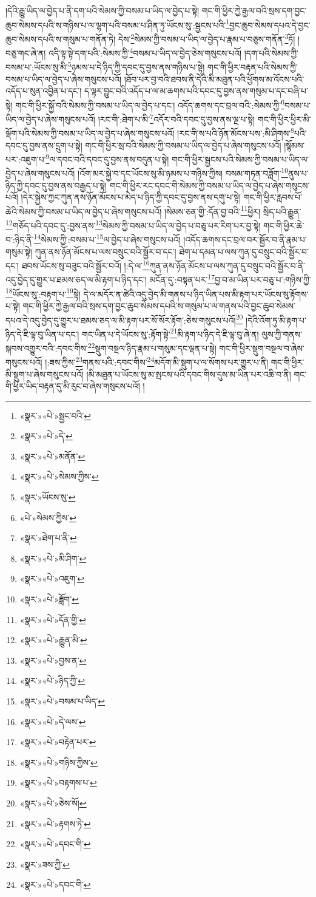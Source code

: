 །དེའི་རྒྱུ་ཡིད་ལ་བྱེད་པ་ནི་དག་པའི་སེམས་ཀྱི་བསམ་པ་ཡིད་ལ་བྱེད་པ་སྟེ། གང་གི་ཕྱིར་ཀྱེ་རྒྱལ་བའི་སྲས་དག་བྱང་ཆུབ་སེམས་དཔའི་ས་གཉིས་པ་ལ་ལྷག་པའི་བསམ་པ་ཤིན་ཏུ་ཡོངས་སུ་:སྦྱངས་པའི་\footnote{«སྣར་»«པེ་»སྦྱང་བའི་}བྱང་ཆུབ་སེམས་དཔའ་དེ་བྱང་ཆུབ་སེམས་དཔའི་ས་གསུམ་པ་གནོན་ཏེ། དེས་\footnote{«སྣར་»«པེ་»དེ་}སེམས་ཀྱི་བསམ་པ་ཡིད་ལ་བྱེད་པ་རྣམ་པ་བཅུས་གནོན་\footnote{«སྣར་»«པེ་»མནོན་}ཏོ། །བཅུ་གང་ཞེ་ན། འདི་ལྟ་སྟེ་དག་པའི་:སེམས་ཀྱི་\footnote{«སྣར་»«པེ་»སེམས་ཀྱིས་}བསམ་པ་ཡིད་ལ་བྱེད་ཅེས་གསུངས་པའོ། །དག་པའི་སེམས་ཀྱི་བསམ་པ་:ཡོངས་སུ་མི་\footnote{«སྣར་»ཡོངས་སུ་}ཉམས་པ་དེ་ཉིད་ཀྱི་དབང་དུ་བྱས་ནས་གཉིས་པ་སྟེ། གང་གི་ཕྱིར་བརྟན་པའི་སེམས་ཀྱི་བསམ་པ་ཡིད་ལ་བྱེད་པ་ཞེས་གསུངས་པའོ། །ཐོབ་པར་བྱ་བའི་ཐབས་ནི་དེའི་མི་མཐུན་པའི་ཕྱོགས་མ་འོངས་པའི་འདོད་པ་སུན་འབྱིན་པ་དང་། ད་ལྟར་བྱུང་བའི་འདོད་པ་ལ་མ་ཆགས་པའི་དབང་དུ་བྱས་ནས་གསུམ་པ་དང་བཞི་པ་སྟེ། གང་གི་ཕྱིར་སྐྱོ་བའི་སེམས་ཀྱི་བསམ་པ་ཡིད་ལ་བྱེད་པ་དང་། འདོད་ཆགས་དང་བྲལ་བའི་:སེམས་ཀྱི་\footnote{«པེ་»སེམས་ཀྱིས་}བསམ་པ་ཡིད་ལ་བྱེད་པ་ཞེས་གསུངས་པའོ། །རང་གི་:ཐེག་པ་མི་\footnote{«སྣར་»ཐེག་པ་ནི་}འདོར་བའི་དབང་དུ་བྱས་ནས་ལྔ་པ་སྟེ། གང་གི་ཕྱིར་ཕྱིར་མི་ལྡོག་པའི་སེམས་ཀྱི་བསམ་པ་ཡིད་ལ་བྱེད་པ་ཞེས་གསུངས་པའོ། །རང་གི་ས་པའི་ཉོན་མོངས་པས་:མི་ཤིགས་\footnote{«སྣར་»«པེ་»མི་ཤིག་}པའི་དབང་དུ་བྱས་ནས་དྲུག་པ་སྟེ། གང་གི་ཕྱིར་སྲ་བའི་སེམས་ཀྱི་བསམ་པ་ཡིད་ལ་བྱེད་པ་ཞེས་གསུངས་པའོ། །སྙོམས་པར་:འཇུག་པ་\footnote{«སྣར་»«པེ་»འཇུག་}ལ་དབང་བའི་དབང་དུ་བྱས་ནས་བདུན་པ་སྟེ། གང་གི་ཕྱིར་སྦྱངས་པའི་སེམས་ཀྱི་བསམ་པ་ཡིད་ལ་བྱེད་པ་ཞེས་གསུངས་པའོ། །འོག་མར་སྐྱེ་བ་དང་ཡོངས་སུ་མི་ཉམས་པ་གཉིས་ཀྱིས། བསམ་གཏན་བཟློག་\footnote{«སྣར་»«པེ་»ཟློག་}ནུས་པ་ཉིད་ཀྱི་དབང་དུ་བྱས་ནས་བརྒྱད་པ་སྟེ། གང་གི་ཕྱིར་རང་དབང་གི་སེམས་ཀྱི་བསམ་པ་ཡིད་ལ་བྱེད་པ་ཞེས་གསུངས་པའོ། །དེར་སྐྱེས་ཀྱང་ཀུན་ནས་ཉོན་མོངས་པ་མེད་པ་ཉིད་ཀྱི་དབང་དུ་བྱས་ནས་དགུ་པ་སྟེ། གང་གི་ཕྱིར་རླབས་པོ་ཆེའི་སེམས་ཀྱི་བསམ་པ་ཡིད་ལ་བྱེད་པ་ཞེས་གསུངས་པའོ། །སེམས་ཅན་གྱི་:དོན་བྱ་བའི་\footnote{«སྣར་»«པེ་»དོན་གྱི་}ཕྱིར། སྲིད་པའི་རྒྱུན་\footnote{«སྣར་»«པེ་»རྒྱུན་མི་}གཅོད་པའི་དབང་དུ་:བྱས་ནས་\footnote{«སྣར་»«པེ་»བྱས་ན་}སེམས་ཀྱི་བསམ་པ་ཡིད་ལ་བྱེད་པ་བཅུ་པར་རིག་པར་བྱ་སྟེ། གང་གི་ཕྱིར་ཆེ་བ་:ཉིད་ནི་\footnote{«སྣར་»«པེ་»ཉིད་ཀྱི་}སེམས་ཀྱི་:བསམ་པ་\footnote{«སྣར་»«པེ་»བསམ་པ་ཡིད་}ལ་བྱེད་པ་ཞེས་གསུངས་པའོ། །འདོད་ཆགས་དང་བྲལ་བར་སྦྱོར་བ་ནི་རྣམ་པ་གསུམ་སྟེ། ཀུན་ནས་ཉོན་མོངས་པ་ལས་བསྲུང་བའི་སྦྱོར་བ་དང་། ཐེག་པ་དམན་པ་ལས་ཀུན་དུ་བསྲུང་བའི་སྦྱོར་བ་དང་། ཐབས་ཡོངས་སུ་བཟུང་བའི་སྦྱོར་བའོ། །:དེ་ལ་\footnote{«སྣར་»«པེ་»དེ་ལས་}ཀུན་ནས་ཉོན་མོངས་པ་ལས་ཀུན་དུ་བསྲུང་བའི་སྦྱོར་བ་ནི་འདུ་བྱེད་དུ་གྱུར་པ་ཐམས་ཅད་ལ་མི་རྟག་པ་ཉིད་དང་། མངོན་དུ་:བསྟན་པར་\footnote{«སྣར་»«པེ་»བརྟེན་པར་}བྱ་བ་མ་ཡིན་པར་བཅུ་པ་:གཉིས་ཀྱི་\footnote{«སྣར་»«པེ་»གཉིས་ཀྱིས་}ཡོངས་སུ་:བརྟག་པ་\footnote{«སྣར་»«པེ་»བརྟགས་པ་}སྟེ། དེ་ལ་མདོར་ན་ཚེའི་འདུ་བྱེད་མི་གནས་པ་ཉིད་ཡིན་པས་མི་རྟག་པར་ཡོངས་སུ་རྟོགས་པ་སྟེ། གང་གི་ཕྱིར་ཀྱེ་རྒྱལ་བའི་སྲས་དག་བྱང་ཆུབ་སེམས་དཔའི་ས་གསུམ་པ་ལ་གནས་པའི་བྱང་ཆུབ་སེམས་དཔའ་དེ་འདུ་བྱེད་དུ་གྱུར་པ་ཐམས་ཅད་ལ་མི་རྟག་པར་སོ་སོར་རྟོག་:ཅེས་གསུངས་པའོ།\footnote{«སྣར་»«པེ་»ཅེས་སོ།} །དེའི་འོག་ཏུ་མི་རྟག་པ་ཉིད་དེ་ཇི་ལྟ་བུ་ཡིན་པ་དང་། གང་ཡིན་པ་དེ་ཡོངས་སུ་:རྟོག་སྟེ་\footnote{«སྣར་»«པེ་»རྟགས་ཏེ་}མི་རྟག་པ་ཉིད་དེ་ཇི་ལྟ་བུ་ཞེ་ན། ལུས་ཀྱི་གནས་སྐབས་འགྱུར་བའི་:དབང་གིས་\footnote{«སྣར་»«པེ་»དབང་གི་}སྡུག་བསྔལ་ཉིད་རྣམ་པ་གསུམ་དང་ལྡན་པ་སྟེ། གང་གི་ཕྱིར་སྡུག་བསྔལ་བ་ཞེས་གསུངས་པའོ། །:ཟས་ཀྱིས་\footnote{«སྣར་»ཟས་ཀྱི་}གནས་པའི་:དབང་གིས་\footnote{«སྣར་»«པེ་»དབང་གི་}མདོག་མི་སྡུག་པ་ལ་སོགས་པར་གྱུར་པ་ནི། གང་གི་ཕྱིར་མི་སྡུག་པ་ཞེས་གསུངས་པའོ། །མི་མཐུན་པ་ཡོངས་སུ་མ་སྤངས་པའི་དབང་གིས་དུས་མ་ཡིན་པར་འཆི་བ་ནི། གང་གི་ཕྱིར་ཡིད་བརྟན་དུ་མི་རུང་བ་ཞེས་གསུངས་པའོ། །
